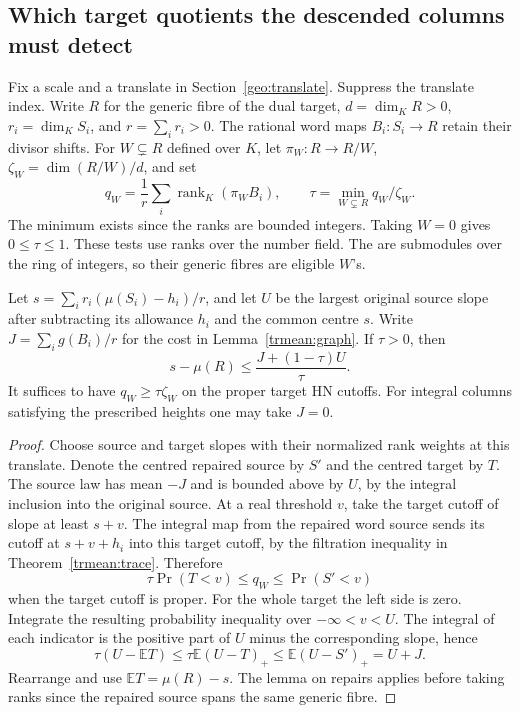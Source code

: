 \subsection{Which target quotients the descended columns must detect}
\label{rank:section}

Fix a scale and a translate in Section~\ref{geo:translate}. Suppress
the translate index. Write \(R\) for the generic fibre of the dual
target, \(d=\dim_K R>0\), \(r_i=\dim_K S_i\), and \(r=\sum_i r_i>0\).
The rational word maps \(B_i:S_i\to R\) retain their divisor shifts.
For \(W\subsetneq R\) defined over \(K\), let \(\pi_W:R\to R/W\),
\(\zeta_W=\dim(R/W)/d\), and set
\[
 q_W=\frac{1}{r}\sum_i\operatorname{rank}_K(\pi_W B_i),
 \qquad \tau=\min_{W\subsetneq R}q_W/\zeta_W .
\]
The minimum exists since the ranks are bounded integers. Taking
\(W=0\) gives \(0\le\tau\le1\). These tests use ranks over the number
field. The  are submodules
over the ring of integers, so their generic fibres are eligible
\(W\)'s.

\begin{proposition}\label{rank:transfer}
Let \(s=\sum_i r_i(\mu(S_i)-h_i)/r\), and let \(U\) be the largest
original source slope after subtracting its allowance \(h_i\) and
the common centre \(s\). Write \(J=\sum_i g(B_i)/r\) for the cost in
Lemma~\ref{trmean:graph}. If \(\tau>0\), then
\[
                   s-\mu(R)\le\frac{J+(1-\tau)U}{\tau}.
\]
It suffices to have \(q_W\ge\tau\zeta_W\) on the proper target HN
cutoffs. For integral columns satisfying the prescribed heights
one may take \(J=0\).
\end{proposition}
\begin{proof}
Choose source and target slopes with their normalized rank weights
at this translate. Denote the centred repaired source by \(S'\)
and the centred target by \(T\). The source law has mean \(-J\)
and is bounded above by \(U\), by the integral inclusion into the
original source. At a real threshold \(v\), take the target cutoff
of slope at least \(s+v\). The integral map from the repaired word
source sends its cutoff at \(s+v+h_i\) into this target cutoff, by
the filtration inequality in Theorem~\ref{trmean:trace}. Therefore
\[
       \tau\Pr(T<v)\le q_W\le\Pr(S'<v)
\]
when the target cutoff is proper. For the whole target the left
side is zero. Integrate the resulting probability inequality over
\(-\infty<v<U\). The integral of each indicator is the positive
part of \(U\) minus the corresponding slope, hence
\[
 \tau(U-\mathbb ET)\le\tau\mathbb E(U-T)_+
        \le\mathbb E(U-S')_+=U+J.
\]
Rearrange and use \(\mathbb ET=\mu(R)-s\). The lemma on repairs
applies before taking ranks since the repaired source spans the
same generic fibre.
\end{proof}

